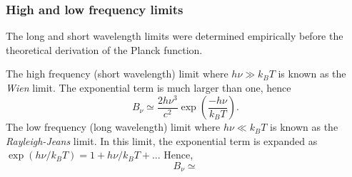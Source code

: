 \subsubsection{High and low frequency limits}
The long and short wavelength limits were determined empirically before the theoretical derivation of the Planck function.
\par 
The high frequency (short wavelength) limit where \(h\nu \gg k_B T\) is known as the \emph{Wien} limit.
 The exponential term is much larger than one, hence
%
\begin{equation}
	B_\nu \simeq \frac{2 h \nu^3}{c^2} \exp(\frac{-h\nu}{k_BT}).
	\label{eq:AP:wien_limit}
\end{equation}
%
The low frequency (long wavelength) limit where \(h\nu \ll k_B T\) is known as the \emph{Rayleigh-Jeans} limit.
 In this limit, the exponential term is expanded as \(\exp( h\nu/k_BT) = 1 + h\nu/k_BT + ...\) Hence,
%
\begin{equation}
	B_\nu \simeq 
\end{equation}











